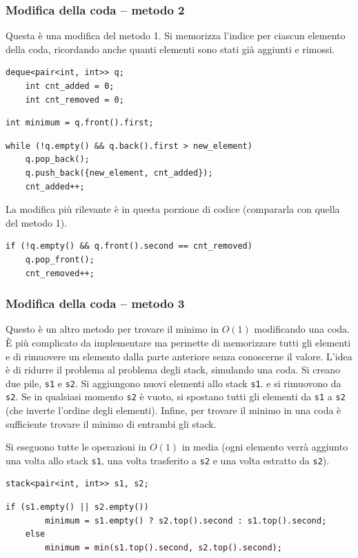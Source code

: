 \documentclass[italian,10pt,a4paper]{article}
\begin{document}
	\subsubsection{Modifica della coda -- metodo 2}
	Questa è una modifica del metodo 1. Si memorizza l'indice per ciascun elemento della coda, ricordando anche quanti elementi sono stati già aggiunti e rimossi.
\begin{lstlisting}[caption={implementazione della coda con contatori di elementi aggiunti e rimossi.}]
	deque<pair<int, int>> q;
	int cnt_added = 0;
	int cnt_removed = 0;
\end{lstlisting}
\begin{lstlisting}[caption={trovare il minimo.}]
	int minimum = q.front().first;
\end{lstlisting}
\begin{lstlisting}[caption={aggiungere un elemento.}]
	while (!q.empty() && q.back().first > new_element)
	q.pop_back();
	q.push_back({new_element, cnt_added});
	cnt_added++;
\end{lstlisting}
La modifica più rilevante è in questa porzione di codice (compararla con quella del metodo 1).
\begin{lstlisting}[caption={rimuovere un elemento.}]
	if (!q.empty() && q.front().second == cnt_removed) 
	q.pop_front();
	cnt_removed++;
\end{lstlisting}
\subsubsection{Modifica della coda -- metodo 3}
Questo è un altro metodo per trovare il minimo in $O(1)$ modificando una coda. È più complicato da implementare ma permette di memorizzare tutti gli elementi e di rimuovere un elemento dalla parte anteriore senza conoscerne il valore. L'idea è di ridurre il problema al problema degli stack, simulando una coda. Si creano due pile, \texttt{s1} e \texttt{s2}. Si aggiungono nuovi elementi allo stack \texttt{s1}. e si rimuovono da \texttt{s2}. Se in qualsiasi momento \texttt{s2} è vuoto, si spostano tutti gli elementi da \texttt{s1} a \texttt{s2} (che inverte l'ordine degli elementi). Infine, per trovare il minimo in  una coda è sufficiente trovare il minimo di entrambi gli stack. \par
Si eseguono tutte le operazioni in $O(1)$ in media (ogni elemento verrà aggiunto una volta allo stack \texttt{s1}, una volta trasferito a \texttt{s2} e una volta estratto da \texttt{s2}).
\begin{lstlisting}[caption={implementazione.}]
	stack<pair<int, int>> s1, s2;
\end{lstlisting}
\begin{lstlisting}[caption={trovare il minimo.}]
	if (s1.empty() || s2.empty()) 
		minimum = s1.empty() ? s2.top().second : s1.top().second;
	else
		minimum = min(s1.top().second, s2.top().second);
\end{lstlisting}
\end{document}
